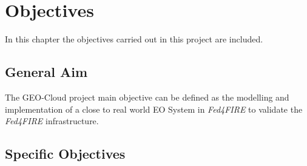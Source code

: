 \chapter{Objectives}
\label{chap:objetivos}
In this chapter the objectives carried out in this project are included.

\section{General Aim}

The GEO-Cloud project main objective can be defined as the modelling and
implementation of a close to real world \ac{EO} System in \emph{Fed4FIRE} to validate the \emph{Fed4FIRE} infrastructure.

\section{Specific Objectives}

